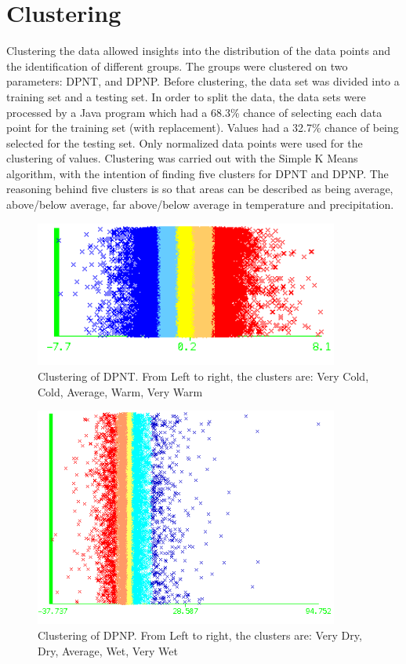 \documentclass[11pt]{article}
\begin{document}
\section{Clustering}
Clustering the data allowed insights into the distribution of the data points and the identification of different groups. The groups were clustered on two parameters: DPNT, and DPNP. Before clustering, the data set was divided into a training set and a testing set. In order to split the data, the data sets were processed by a Java program which had a 68.3\% chance of selecting each data point for the training set (with replacement). Values had a 32.7\% chance of being selected for the testing set. Only normalized data points were used for the clustering of values. Clustering was carried out with the Simple K Means algorithm, with the intention of finding five clusters for DPNT and DPNP. The reasoning behind five clusters is so that areas can be described as being average, above/below average, far above/below average in temperature and precipitation.

\begin{figure}[h!]
\centering
\includegraphics[width=10cm]{dpnt_cluster}
\caption{Clustering of DPNT. From Left to right, the clusters are: Very Cold, Cold, Average, Warm, Very Warm}
\label{fig:dpnt_cluster}
\end{figure}

\begin{figure}[h!]
\centering
\includegraphics[width=10cm]{dpnp_cluster}
\caption{Clustering of DPNP. From Left to right, the clusters are: Very Dry, Dry, Average, Wet, Very Wet}
\label{fig:dpnp_cluster}
\end{figure}
\end{document}
